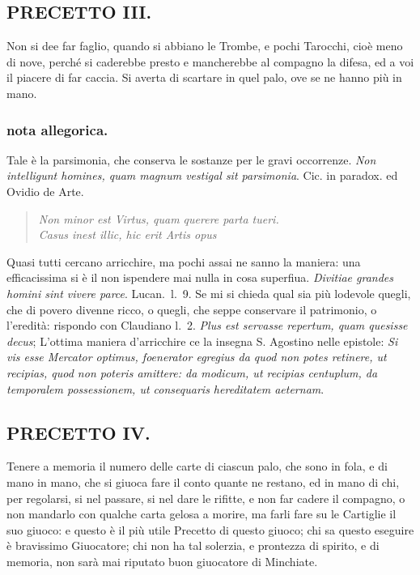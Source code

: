 \documentclass[11pt,a6paper]{article}
\newcommand{\literaryquote}[1]{%
\kern -6pt  \begin{verse}
    {\footnotesize \it #1}
  \end{verse}\kern -2pt%
}
\begin{document}
\subsection{PRECETTO III.}

Non si dee far faglio, quando si abbiano
le Trombe, e pochi Tarocchi, cioè
meno di nove, perché si caderebbe presto e
mancherebbe al compagno la difesa, ed a voi
il piacere di far caccia. Si averta di scartare
in quel palo, ove se ne hanno più in mano.

\subsubsection{nota allegorica.}
{\footnotesize
Tale è la parsimonia, che conserva le sostanze
per le gravi occorrenze. \textit{Non intelligunt homines,
 quam magnum vestigal sit parsimonia}. Cic. in paradox.
ed Ovidio de Arte.

\literaryquote{Non minor est Virtus, quam querere parta tueri.\\
Casus inest illic, hic erit Artis opus}

Quasi tutti cercano arricchire, ma pochi assai ne
sanno la maniera: una efficacissima si è il non ispendere
mai nulla in cosa superfiua. \textit{Divitiae grandes
  homini sint vivere parce}. Lucan.\ l.\ 9. Se mi si chieda
qual sia più lodevole quegli, che di povero divenne
ricco, o quegli, che seppe conservare il patrimonio, o l'eredità: rispondo con Claudiano l.\ 2.
\textit{Plus est servasse repertum, quam quesisse decus};
L'ottima maniera d'arricchire ce la insegna S. Agostino
nelle epistole: \textit{Si vis esse Mercator optimus,
foenerator egregius da quod non potes retinere, ut
recipias, quod non poteris amittere: da modicum, ut
recipias centuplum, da temporalem possessionem, ut
consequaris hereditatem aeternam}.
}

\subsection{PRECETTO IV.}

Tenere a memoria il numero delle carte
di ciascun palo, che sono in fola, e
di mano in mano, che si giuoca fare il conto
quante ne restano, ed in mano di chi, per
regolarsi, si nel passare, si nel dare le rifitte,
e non far cadere il compagno, o non mandarlo
con qualche carta gelosa a morire, ma
farli fare su le Cartiglie il suo giuoco: e questo
è il più utile Precetto di questo giuoco;
chi sa questo eseguire è bravissimo Giuocatore;
chi non ha tal solerzia, e prontezza di
spirito, e di memoria, non sarà mai riputato
buon giuocatore di Minchiate.
\end{document}
